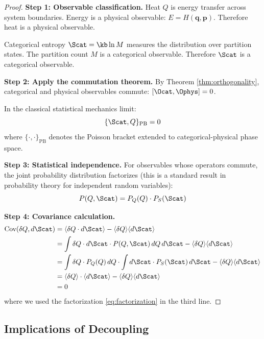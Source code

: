 \begin{proof}
\textbf{Step 1: Observable classification.}
Heat $Q$ is energy transfer across system boundaries. Energy is a physical observable: $E = H(\mathbf{q}, \mathbf{p})$. Therefore heat is a physical observable.

Categorical entropy $\Scat = \kb \ln M$ measures the distribution over partition states. The partition count $M$ is a categorical observable. Therefore $\Scat$ is a categorical observable.

\textbf{Step 2: Apply the commutation theorem.}
By Theorem \ref{thm:orthogonality}, categorical and physical observables commute: $[\Ocat, \Ophys] = 0$.

In the classical statistical mechanics limit:
\begin{equation}
\{\Scat, Q\}_{\text{PB}} = 0
\end{equation}
where $\{\cdot, \cdot\}_{\text{PB}}$ denotes the Poisson bracket extended to categorical-physical phase space.

\textbf{Step 3: Statistical independence.}
For observables whose operators commute, the joint probability distribution factorizes (this is a standard result in probability theory for independent random variables):
\begin{equation}
P(Q, \Scat) = P_Q(Q) \cdot P_S(\Scat)
\label{eq:factorization}
\end{equation}

\textbf{Step 4: Covariance calculation.}
\begin{align}
\text{Cov}(\delta Q, d\Scat) &= \langle \delta Q \cdot d\Scat \rangle - \langle \delta Q \rangle \langle d\Scat \rangle \\
&= \int \delta Q \cdot d\Scat \cdot P(Q, \Scat) \, dQ \, d\Scat - \langle \delta Q \rangle \langle d\Scat \rangle \\
&= \int \delta Q \cdot P_Q(Q) \, dQ \cdot \int d\Scat \cdot P_S(\Scat) \, d\Scat - \langle \delta Q \rangle \langle d\Scat \rangle \\
&= \langle \delta Q \rangle \cdot \langle d\Scat \rangle - \langle \delta Q \rangle \langle d\Scat \rangle \\
&= 0
\end{align}
where we used the factorization \eqref{eq:factorization} in the third line.
\end{proof}

\subsection{Implications of Decoupling}

